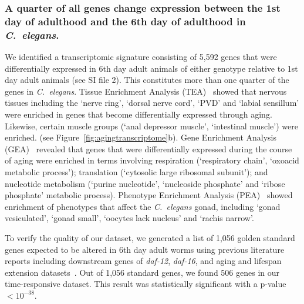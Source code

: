 \documentclass[10pt,letterpaper,twocolumn]{article}
\newcommand{\cel}{\emph{C.~elegans}}
\newcommand{\agen}{5,592}
\newcommand{\goldn}{1,056}
\newcommand{\goldfound}{506}
\newcommand{\goldpval}{$<10^{-38}$}
\begin{document}
\subsubsection*{A quarter of all genes change expression between the 1st day of
                adulthood and the 6th day of adulthood in \cel{}.}
We identified a transcriptomic signature consisting of \agen{} genes that were
differentially expressed in 6th day adult animals of either genotype relative
to 1st day adult animals (see SI file 2). This constitutes more than one quarter
of the genes in \cel{}. Tissue Enrichment Analysis
(TEA)~\cite{Angeles-Albores2016} showed that
nervous tissues including the `nerve ring', `dorsal nerve cord', `PVD' and
`labial sensillum' were enriched in genes that become differentially expressed
through aging. Likewise, certain muscle groups (`anal depressor muscle',
`intestinal muscle') were enriched.
(see Figure~\ref{fig:agingtranscriptome}b). Gene Enrichment Analysis
(GEA)~\cite{} revealed that genes that
were differentially expressed during the course of
aging were enriched in terms involving respiration (`respiratory
chain', `oxoacid metabolic process'); translation (`cytosolic large
ribosomal subunit'); and nucleotide metabolism (`purine nucleotide', `nucleoside
phosphate' and `ribose phosphate' metabolic process). Phenotype Enrichment
Analysis (PEA)~\cite{} showed enrichment
of phenotypes that affect the \cel{} gonad, including `gonad vesiculated',
`gonad small', `oocytes lack nucleus' and `rachis narrow'.

To verify the quality of our dataset, we generated a list of \goldn{} golden
standard genes expected to be altered in 6th day adult worms using previous
literature reports including downstream genes of \emph{daf-12}, \emph{daf-16},
and aging and lifespan extension datasets~\cite{Murphy2003,Halaschek-wiener2005,
Lund2002,McCormick2012,Eckley2013}. Out of \goldn{} standard genes, we found
\goldfound{} genes in our time-responsive dataset. This result was statistically
significant with a p-value \goldpval{}.
\end{document}

